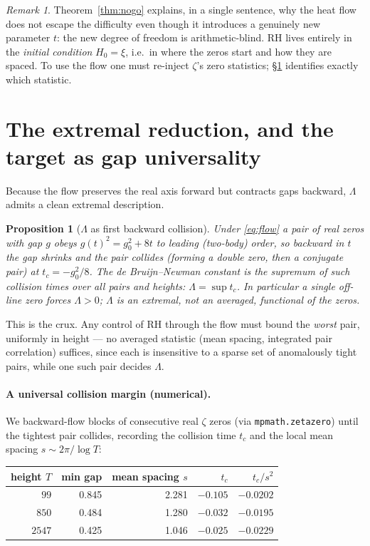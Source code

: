 \documentclass[11pt]{amsart}
\newtheorem{proposition}[theorem]{Proposition}
\theoremstyle{definition}
\theoremstyle{remark}
\newtheorem{remark}[theorem]{Remark}
\begin{document}
\begin{remark}
Theorem~\ref{thm:nogo} explains, in a single sentence, why the heat flow does not escape the difficulty even
though it introduces a genuinely new parameter $t$: the new degree of freedom is arithmetic-blind. RH lives
entirely in the \emph{initial condition} $H_0=\xi$, i.e.\ in where the zeros start and how they are spaced. To
use the flow one must re-inject $\zeta$'s zero statistics; \S\ref{sec:extremal} identifies exactly which
statistic.
\end{remark}

\section{The extremal reduction, and the target as gap universality}\label{sec:extremal}

Because the flow preserves the real axis forward but contracts gaps backward, $\Lambda$ admits a clean
extremal description.

\begin{proposition}[$\Lambda$ as first backward collision]\label{prop:collision}
Under \eqref{eq:flow} a pair of real zeros with gap $g$ obeys $g(t)^2=g_0^2+8t$ to leading (two-body) order, so
backward in $t$ the gap shrinks and the pair collides (forming a double zero, then a conjugate pair) at
$t_c=-g_0^2/8$. The de Bruijn--Newman constant is the supremum of such collision times over all pairs and
heights: $\Lambda=\sup t_c$. In particular a \emph{single} off-line zero forces $\Lambda>0$; $\Lambda$ is an
\emph{extremal}, not an averaged, functional of the zeros.
\end{proposition}

This is the crux. Any control of RH through the flow must bound the \emph{worst} pair, uniformly in height ---
no averaged statistic (mean spacing, integrated pair correlation) suffices, since each is insensitive to a
sparse set of anomalously tight pairs, while one such pair decides $\Lambda$.

\paragraph{A universal collision margin (numerical).} We backward-flow blocks of consecutive real $\zeta$ zeros
(via \texttt{mpmath.zetazero}) until the tightest pair collides, recording the collision time $t_c$ and the
local mean spacing $s\sim 2\pi/\log T$:

\begin{center}
\begin{tabular}{rrrrr}
\toprule
height $T$ & min gap & mean spacing $s$ & $t_c$ & $t_c/s^2$\\
\midrule
$99$ & 0.845 & 2.281 & $-0.105$ & $-0.0202$\\
$850$ & 0.484 & 1.280 & $-0.032$ & $-0.0195$\\
$2547$ & 0.425 & 1.046 & $-0.025$ & $-0.0229$\\
\bottomrule
\end{tabular}
\end{center}
\end{document}
